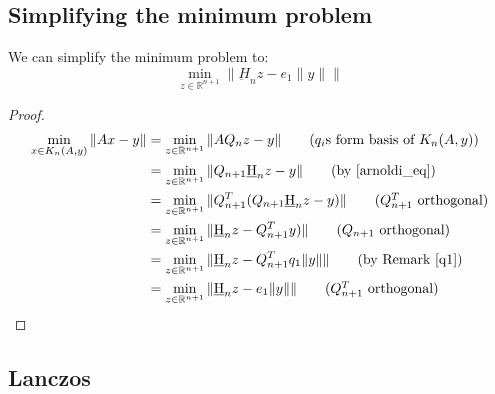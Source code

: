 \documentclass{article}
\newcommand{\reals}{\mathbb R}
\newcommand{\hess}{\underbar H}
\begin{document}
 \subsection{Simplifying the minimum problem}
 We can simplify the minimum problem to: $$\min_{z \in \reals^{n+1}} \|\hess_n z - e_1\|y\|\|$$
 \begin{proof}
 \begin{align}
  \min_{x \in K_n(A, y)} \|A x - y\| &= \min_{z \in \reals^{n+1}} \|A Q_n z - y\| \tag{$q_i$s form basis of $K_n(A, y)$}\\
  &= \min_{z \in \reals^{n+1}} \|Q_{n+1}\hess_n z - y\| \tag{by \eqref {arnoldi_eq}}\\
  &= \min_{z \in \reals^{n+1}} \|Q_{n+1}^T(Q_{n+1}\hess_n z - y)\| \tag{$Q_{n+1}^T$ orthogonal}\\
  &= \min_{z \in \reals^{n+1}} \|\hess_n z - Q_{n+1}^T y)\| \tag{$Q_{n+1}$ orthogonal}\\
  &= \min_{z \in \reals^{n+1}} \|\hess_n z - Q_{n+1}^T q_1 \|y\|\| \tag{by Remark \ref{q1}}\\
  &= \min_{z \in \reals^{n+1}} \|\hess_n z - e_1\|y\|\| \tag{$Q_{n+1}^T$ orthogonal}
 \end{align}

 \end{proof}

 \newpage


 \subsection{Lanczos}
 
\end{document}

